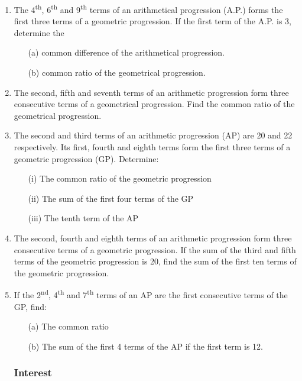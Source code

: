 \begin{enumerate}
	\item The 4\textsuperscript{th}, 6\textsuperscript{th} and 9\textsuperscript{th} terms of an arithmetical progression (A.P.) forms the first three terms of a geometric progression. If the first term of the A.P. is 3, determine the
	\begin{itemize}
	\item[(a)] common difference of the arithmetical progression.
	\item[(b)] common ratio of the geometrical progression.
	\end{itemize}
	
	\item The second, fifth and seventh terms of an arithmetic progression form three consecutive terms of a geometrical progression. Find the common ratio of the geometrical progression.
	
	\item The second and third terms of an arithmetic progression (AP) are 20 and 22 respectively. Its first, fourth and eighth terms form the first three terms of a geometric progression (GP). Determine:
	\begin{itemize}
	\item[(i)] The common ratio of the geometric progression
	\item[(ii)] The sum of the first four terms of the GP
	\item[(iii)] The tenth term of the AP
	\end{itemize}
	
	\item The second, fourth and eighth terms of an arithmetic progression form three consecutive terms of a geometric progression. If the sum of the third and fifth terms of the geometric progression is 20, find the sum of the first ten terms of the geometric progression.
	
	\item If the 2\textsuperscript{nd}, 4\textsuperscript{th} and 7\textsuperscript{th} terms of an AP are the first consecutive terms of the GP, find:
	\begin{itemize}
	\item[(a)] The common ratio
	\item[(b)] The sum  of the first 4 terms of the AP if the first term is 12.
	\end{itemize}
	
			\subsubsection{Interest}
			

\end{enumerate}
